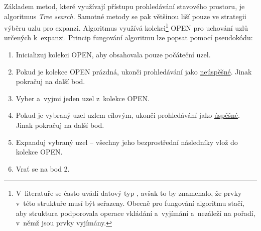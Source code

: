 Základem metod, které využívají přístupu prohledávání stavového prostoru, je algoritmus \emph{Tree search}. Samotné metody se pak většinou liší pouze ve strategii výběru uzlu pro expanzi. Algoritmus využívá kolekci\footnote{V~literatuře  se často uvádí datový typ , avšak to by znamenalo, že prvky v~této struktuře musí být seřazeny. Obecně pro fungování algoritmu stačí, aby struktura podporovala operace vkládání a~vyjímání a~nezáleží na pořadí, v~němž jsou prvky vyjímány.} OPEN pro uchování uzlů určených k~expanzi. Princip fungování algoritmu lze popsat pomocí pseudokódu:
\begin{enumerate}
    \item Inicializuj kolekci OPEN, aby obsahovala pouze počáteční uzel.
    \item Pokud je kolekce OPEN prázdná, ukonči prohledávání jako \underline{neúspěšné}. Jinak pokračuj na další bod.
    \item Vyber a~vyjmi jeden uzel z~kolekce OPEN.
    \item Pokud je vybraný uzel uzlem cílovým, ukonči prohledávání jako \underline{úspěšné}. Jinak pokračuj na další bod.
    \item Expanduj vybraný uzel -- všechny jeho bezprostřední následníky vlož do kolekce OPEN.
    \item Vrať se na bod 2.
\end{enumerate}

